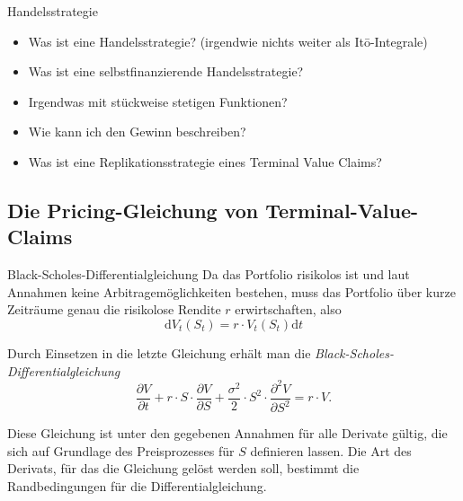 \begin{info}{Handelsstrategie}
    \begin{itemize}
        \item Was ist eine Handelsstrategie? (irgendwie nichts weiter als Itō-Integrale)
        \item Was ist eine selbstfinanzierende Handelsstrategie?
        \item Irgendwas mit stückweise stetigen Funktionen?
        \item Wie kann ich den Gewinn beschreiben?
        \item Was ist eine Replikationsstrategie eines Terminal Value Claims?
    \end{itemize}
\end{info}

\subsection{Die Pricing-Gleichung von Terminal-Value-Claims}

\begin{defi}{Black-Scholes-Differentialgleichung}
    Da das Portfolio risikolos ist und laut Annahmen keine Arbitragemöglichkeiten bestehen, muss das Portfolio über kurze Zeiträume genau die risikolose Rendite $r$ erwirtschaften, also
    \[
        \mathrm{d} V_t(S_t) = r \cdot V_t(S_t) \mathrm{d} t
    \]

    Durch Einsetzen in die letzte Gleichung erhält man die \emph{Black-Scholes-Differentialgleichung}
    \[
        \frac{\partial V}{\partial t}+r \cdot S \cdot \frac{\partial V}{\partial S} + {\frac{\sigma^{2}}{2}} \cdot S^{2} \cdot \frac{\partial ^{2}V}{\partial S^{2}} = r \cdot V.
    \]

    Diese Gleichung ist unter den gegebenen Annahmen für alle Derivate gültig, die sich auf Grundlage des Preisprozesses für $S$ definieren lassen.
    Die Art des Derivats, für das die Gleichung gelöst werden soll, bestimmt die Randbedingungen für die Differentialgleichung.
\end{defi}

